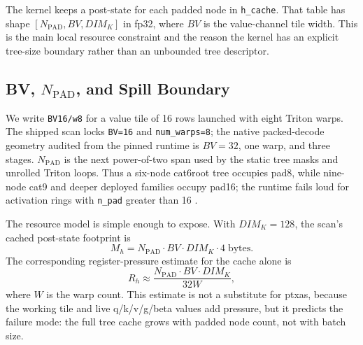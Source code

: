 \documentclass[conference]{IEEEtran}
\newcommand{\code}[1]{\texttt{#1}}
\begin{document}
The kernel keeps a post-state for each padded node in \code{h\_cache}. That table has shape \([N_{\mathrm{PAD}}, BV, DIM_K]\) in fp32, where \(BV\) is the value-channel tile width. This is the main local resource constraint and the reason the kernel has an explicit tree-size boundary rather than an unbounded tree descriptor.

\subsection{BV, \(N_{\mathrm{PAD}}\), and Spill Boundary}

We write \code{BV16/w8} for a value tile of 16 rows launched with eight Triton warps. The shipped scan locks \code{BV=16} and \code{num\_warps=8}; the native packed-decode geometry audited from the pinned runtime is \(BV=32\), one warp, and three stages. \(N_{\mathrm{PAD}}\) is the next power-of-two span used by the static tree masks and unrolled Triton loops. Thus a six-node cat6root tree occupies pad8, while nine-node cat9 and deeper deployed families occupy pad16; the runtime fails loud for activation rings with \code{n\_pad} greater than 16 \cite{lumo2026receipts}.

The resource model is simple enough to expose. With \(DIM_K=128\), the scan's cached post-state footprint is
\begin{equation}
M_h = N_{\mathrm{PAD}}\cdot BV\cdot DIM_K\cdot4\;\mathrm{bytes}.
\end{equation}
The corresponding register-pressure estimate for the cache alone is
\begin{equation}
R_h \approx \frac{N_{\mathrm{PAD}}\cdot BV\cdot DIM_K}{32W},
\end{equation}
where \(W\) is the warp count. This estimate is not a substitute for ptxas, because the working tile and live q/k/v/g/beta values add pressure, but it predicts the failure mode: the full tree cache grows with padded node count, not with batch size.
\end{document}
